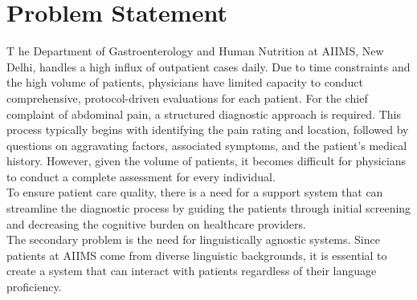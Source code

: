 \section{Problem Statement}
\lettrine{T}{ }he Department of Gastroenterology and Human Nutrition at AIIMS, New Delhi, handles a high influx of outpatient cases daily. Due to time constraints and the high volume of patients, physicians have limited capacity to conduct comprehensive, protocol-driven evaluations for each patient. For the chief complaint of abdominal pain, a structured diagnostic approach is required. This process typically begins with identifying the pain rating and location, followed by questions on aggravating factors, associated symptoms, and the patient’s medical history. However, given the volume of patients, it becomes difficult for physicians to conduct a complete assessment for every individual.\\[\baselineskip]

\noindent To ensure patient care quality, there is a need for a support system that can streamline the diagnostic process by guiding the patients through initial screening and decreasing the cognitive burden on healthcare providers.\\[\baselineskip]

\noindent The secondary problem is the need for linguistically agnostic systems. Since patients at AIIMS come from diverse linguistic backgrounds, it is essential to create a system that can interact with patients regardless of their language proficiency.

